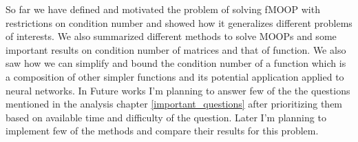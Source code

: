 So far we have defined and motivated the problem of solving fMOOP with restrictions on condition number and showed how it generalizes different problems of interests. We also summarized different methods to solve MOOPs and some important results on condition number of matrices and that of function. We also saw how we can simplify and bound the condition number of a function which is a composition of other simpler functions and its potential application applied to neural networks.
\newline \newline In Future works I'm planning to answer few of the the questions mentioned in the analysis chapter \ref{important_questions} after prioritizing them based on available time and difficulty of the question. Later I'm planning to implement few of the methods and compare their results for this problem.